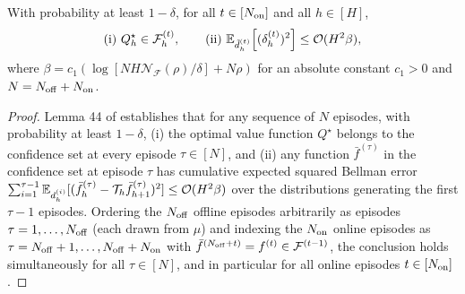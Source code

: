 \begin{lem}
\label{lem:ch02-good_event}
With probability at least $1-\delta$, for all $t \in [N_{{\operatorname{on}}}]$ and all $h \in [H]$,
\begin{equation}
    \text{(i) } Q^\star_h \in \mathcal{F}^{(t)}_h, \qquad \text{(ii) } \mathbb{E}_{\tilde{d}_h^{(t)}}\!\left[(\delta_h^{(t)})^2\right] \leq {\mathcal{O}}(H^2\beta),
\end{equation}
where $\beta = c_1\left(\log \left[N H \mathcal{N}_{\mathcal{F}}(\rho) / \delta\right]+ N \rho\right)$ for an absolute constant $c_1 > 0$ and $N = N_{{\operatorname{off}}} + N_{{\operatorname{on}}}$.
\end{lem}

\begin{proof}
Lemma 44 of \citet{jin2021bellmaneluder} establishes that for any sequence of $N$ episodes, with probability at least $1-\delta$, (i) the optimal value function $Q^\star$ belongs to the confidence set at every episode $\tau \in [N]$, and (ii) any function $\bar{f}^{(\tau)}$ in the confidence set at episode $\tau$ has cumulative expected squared Bellman error $\sum_{i=1}^{\tau-1} \mathbb{E}_{d_h^{(i)}}[(\bar{f}_h^{(\tau)} - {\mathcal{T}}_h \bar{f}_{h+1}^{(\tau)})^2] \leq {\mathcal{O}}(H^2 \beta)$ over the distributions generating the first $\tau - 1$ episodes. Ordering the $N_{{\operatorname{off}}}$ offline episodes arbitrarily as episodes $\tau = 1, \dots, N_{{\operatorname{off}}}$ (each drawn from $\mu$) and indexing the $N_{{\operatorname{on}}}$ online episodes as $\tau = N_{{\operatorname{off}}} + 1, \dots, N_{{\operatorname{off}}} + N_{{\operatorname{on}}}$ with $\bar{f}^{(N_{{\operatorname{off}}} + t)} = f^{(t)} \in {\mathcal{F}}^{(t-1)}$, the conclusion holds simultaneously for all $\tau \in [N]$, and in particular for all online episodes $t \in [N_{{\operatorname{on}}}]$.
\end{proof}

